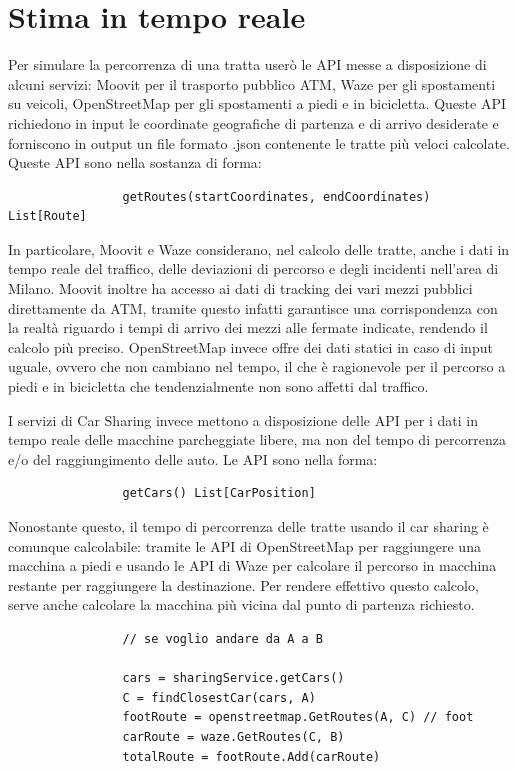 \documentclass[a4paper]{report}
\begin{document}
		\section{Stima in tempo reale}
		{\large
			Per simulare la percorrenza di una tratta userò le API messe a disposizione di alcuni servizi: Moovit per il trasporto pubblico ATM, Waze per gli spostamenti su veicoli, OpenStreetMap per gli spostamenti a piedi e in bicicletta. Queste API richiedono in input le coordinate geografiche di partenza e di arrivo desiderate e forniscono in output un file formato .json contenente le tratte più veloci calcolate. Queste API sono nella sostanza di forma:
			
			\begin{verbatim}
				getRoutes(startCoordinates, endCoordinates) List[Route]
			\end{verbatim}
		}
	
		{\large
			In particolare, Moovit e Waze considerano, nel calcolo delle tratte, anche i dati in tempo reale del traffico, delle deviazioni di percorso e degli incidenti nell'area di Milano. Moovit inoltre ha accesso ai dati di tracking dei vari mezzi pubblici direttamente da ATM, tramite questo infatti garantisce una corrispondenza con la realtà riguardo i tempi di arrivo dei mezzi alle fermate indicate, rendendo il calcolo più preciso. OpenStreetMap invece offre dei dati statici in caso di input uguale, ovvero che non cambiano nel tempo, il che è ragionevole per il percorso a piedi e in bicicletta che tendenzialmente non sono affetti dal traffico.
		}
	
		{\large
			I servizi di Car Sharing invece mettono a disposizione delle API per i dati in tempo reale delle macchine parcheggiate libere, ma non del tempo di percorrenza e/o del raggiungimento delle auto. Le API sono nella forma:
		
			\begin{verbatim}
				getCars() List[CarPosition]
			\end{verbatim}	
		}
	
		{\large
			Nonostante questo, il tempo di percorrenza delle tratte usando il car sharing è comunque calcolabile: tramite le API di OpenStreetMap per raggiungere una macchina a piedi e usando le API di Waze per calcolare il percorso in macchina restante per raggiungere la destinazione. Per rendere effettivo questo calcolo, serve anche calcolare la macchina più vicina dal punto di partenza richiesto.

			\begin{verbatim}
				// se voglio andare da A a B
				
				cars = sharingService.getCars()
				C = findClosestCar(cars, A)
				footRoute = openstreetmap.GetRoutes(A, C) // foot
				carRoute = waze.GetRoutes(C, B)
				totalRoute = footRoute.Add(carRoute)
			\end{verbatim}
		}
	
\end{document}
